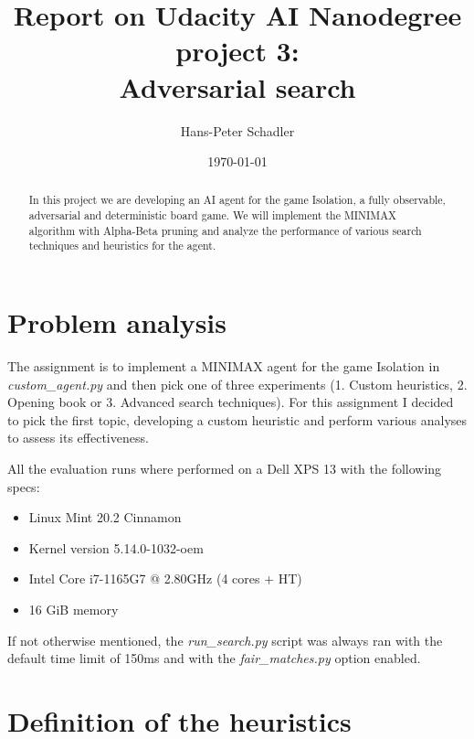 \documentclass[aps,prd,notitlepage,floatfix,superscriptaddress,groupedaddress,nofootinbib]{revtex4-1}
\begin{document}
\title{Report on Udacity AI Nanodegree project 3:\\Adversarial search}

\author{Hans-Peter Schadler}

\date{\today}


\begin{abstract}
    In this project we are developing an AI agent for the game Isolation, a fully observable, adversarial and deterministic board game.
    We will implement the MINIMAX algorithm with Alpha-Beta pruning and analyze the performance of various search techniques and heuristics for the agent.
\end{abstract}

\maketitle




\section{Problem analysis}

The assignment is to implement a MINIMAX agent for the game Isolation in \textit{custom\_agent.py}
and then pick one of three experiments (1. Custom heuristics, 2. Opening book or 3. Advanced search techniques).
For this assignment I decided to pick the first topic, developing a custom heuristic and perform various analyses to
assess its effectiveness.

All the evaluation runs where performed on a Dell XPS 13 with the following specs:
\begin{itemize}[nosep]
    \item Linux Mint 20.2 Cinnamon
    \item Kernel version 5.14.0-1032-oem
    \item Intel Core i7-1165G7 @ 2.80GHz (4 cores + HT)
    \item 16 GiB memory
\end{itemize}
If not otherwise mentioned, the \textit{run\_search.py} script was always ran with the default
time limit of 150ms and with the \textit{fair\_matches.py} option enabled.

\section{Definition of the heuristics}
\end{document}
